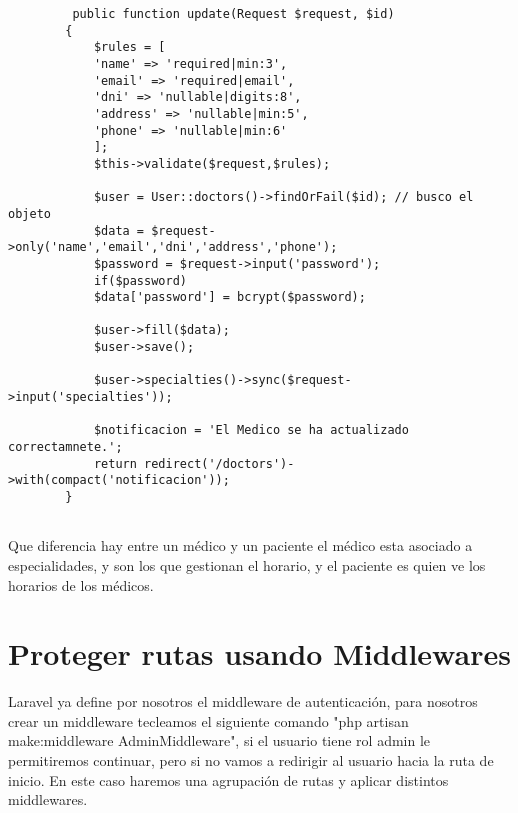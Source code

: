 \documentclass[a4paper]{article}
\begin{document}
	\begin{lstlisting}
		 public function update(Request $request, $id)
		{
			$rules = [
			'name' => 'required|min:3',
			'email' => 'required|email',
			'dni' => 'nullable|digits:8',
			'address' => 'nullable|min:5',
			'phone' => 'nullable|min:6'
			];
			$this->validate($request,$rules);
			
			$user = User::doctors()->findOrFail($id); // busco el objeto
			$data = $request->only('name','email','dni','address','phone');
			$password = $request->input('password');
			if($password)
			$data['password'] = bcrypt($password);
			
			$user->fill($data);
			$user->save();
			
			$user->specialties()->sync($request->input('specialties'));
			
			$notificacion = 'El Medico se ha actualizado correctamnete.';
			return redirect('/doctors')->with(compact('notificacion'));
		}
		
	\end{lstlisting} 


	Que diferencia hay entre un médico y un paciente el médico esta asociado a especialidades, y son los que gestionan el horario, y el paciente es quien ve los horarios de los médicos.
	
	
	\section{Proteger rutas usando Middlewares}
	
	Laravel ya define por nosotros el middleware de autenticación, para nosotros crear un middleware tecleamos el siguiente comando "php artisan make:middleware AdminMiddleware", si el usuario tiene rol admin le permitiremos continuar, pero si no vamos a redirigir al usuario hacia la ruta de inicio. En este caso haremos una agrupación de rutas y aplicar distintos middlewares.
	
\end{document}
